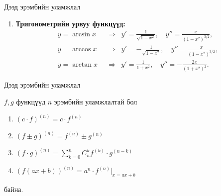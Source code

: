 \begin{frame}[allowframebreaks]{Дээд эрэмбийн уламжлал}
\begin{enumerate}
  \item \textbf{Тригонометрийн урвуу функцүүд:}
  \[
  \begin{aligned}
  &y = \arcsin x 
    &&\Rightarrow&
    y' = \frac{1}{\sqrt{1-x^{2}}}, \quad 
    y'' = \frac{x}{(1-x^{2})^{3/2}},\\[3pt]
  &y = \arccos x 
    &&\Rightarrow&
    y' = -\frac{1}{\sqrt{1-x^{2}}}, \quad 
    y'' = \frac{x}{(1-x^{2})^{3/2}},\\[3pt]
  &y = \arctan x 
    &&\Rightarrow&
    y' = \frac{1}{1+x^{2}}, \quad 
    y'' = -\frac{2x}{(1+x^{2})^{2}}.
  \end{aligned}
  \]

\end{enumerate}
\end{frame}

\begin{frame}[allowframebreaks]{Дээд эрэмбийн уламжлал}
\begin{theorem}
$f,g$ функцүүд $n$ эрэмбийн уламжлалтай бол 
    \begin{enumerate}
        \item $(c\cdot f)^{(n)}=c\cdot f^{(n)}$
        \item $(f\pm g)^{(n)}=f^{(n)}\pm g^{(n)}$
        \item $(f\cdot g)^{(n)}=\sum\limits_{k=0}^{n}C_n^kf^{(k)}\cdot g^{(n-k)}$
        \item $(f(ax+b))^{(n)}=a^n\cdot f^{(n)}|_{x=ax+b}$
    \end{enumerate} байна.
\end{theorem}
\end{frame}

